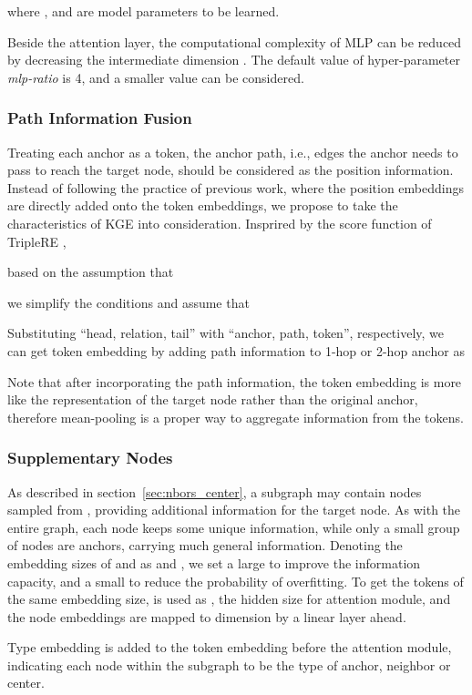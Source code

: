 \documentclass{article}
\begin{document}
where , and  are model parameters to be learned.

Beside the attention layer, the computational complexity of MLP can be reduced by decreasing the intermediate dimension . The default value of hyper-parameter \emph{mlp-ratio} is 4, and a smaller value can be considered.

\subsubsection{Path Information Fusion}
\label{sec:path}
Treating each anchor as a token, the anchor path, i.e., edges the anchor needs to pass to reach the target node, should be considered as the position information. Instead of following the practice of previous work, 
where the position embeddings are directly added onto the token embeddings, we propose to take the characteristics of KGE into consideration. 
Insprired by the score function of TripleRE \cite{yu2021triplere}, 

based on the assumption that

we simplify the conditions and assume that


Substituting ``head, relation, tail'' with ``anchor, path, token'', respectively, we can get token embedding by adding path information to 1-hop or 2-hop anchor as

Note that after incorporating the path information, the token embedding is more like the representation of the target node rather than the original anchor, therefore mean-pooling is a proper way to aggregate information from the tokens.

\subsubsection{Supplementary Nodes}
As described in section~\ref{sec:nbors_center}, a subgraph may contain nodes sampled from , providing additional information for the target node. As with the entire graph, each node keeps some unique information, while only a small group of nodes are anchors, carrying much general information. Denoting the embedding sizes of  and  as  and , we set a large  to improve the information capacity, and a small  to reduce the probability of overfitting. To get the tokens of the same embedding size,  is used as , the hidden size for attention module, and the node embeddings are mapped to dimension  by a linear layer ahead.

Type embedding is added to the token embedding before the attention module, indicating each node within the subgraph to be the type of anchor, neighbor or center.
\end{document}
